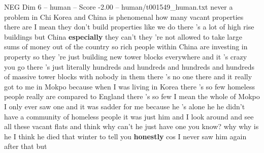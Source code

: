 \begin{textsample}{NEG Dim 6 – human – Score -2.00 – human/t001549\_human.txt}  \label{ex:f6_neg_035}
never a problem in Chi Korea and China is phenomenal how many vacant properties there are I mean they don't build properties like we do there 's a lot of high rise buildings but China \textbf{especially} they can't they 're not allowed to take large sums of money out of the country so rich people within China are investing in property so they 're just building new tower blocks everywhere and it 's crazy you go there 's just literally hundreds and hundreds and hundreds and hundreds of massive tower blocks with nobody in them there 's no one there and it really got to me in Mokpo because when I was living in Korea there 's so few homeless people really are compared to England there 's so few I mean the whole of Mokpo I only ever saw one and it was sadder for me because he 's alone he he didn't have a community of homeless people it was just him and I look around and see all these vacant flats and think why can't he just have one you know? why why is he I think he died that winter to tell you \textbf{honestly} cos I never saw him again after that but

\end{textsample}

